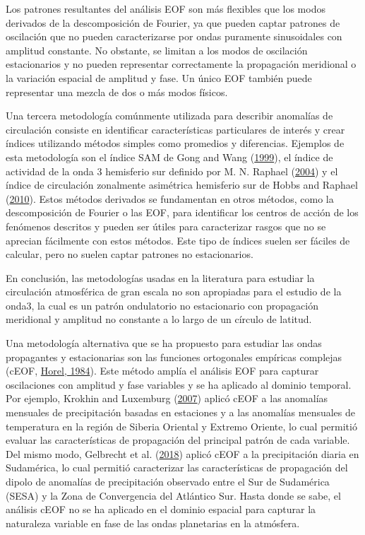 \documentclass[12pt,oneside,a4paper]{reedthesis}
\begin{document}
Los patrones resultantes del análisis EOF son más flexibles que los modos derivados de la descomposición de Fourier, ya que pueden captar patrones de oscilación que no pueden caracterizarse por ondas puramente sinusoidales con amplitud constante.
No obstante, se limitan a los modos de oscilación estacionarios y no pueden representar correctamente la propagación meridional o la variación espacial de amplitud y fase.
Un único EOF también puede representar una mezcla de dos o más modos físicos.

Una tercera metodología comúnmente utilizada para describir anomalías de circulación consiste en identificar características particulares de interés y crear índices utilizando métodos simples como promedios y diferencias.
Ejemplos de esta metodología son el índice SAM de Gong and Wang (\protect\hyperlink{ref-gong1999}{1999}), el índice de actividad de la onda 3 hemisferio sur definido por M. N. Raphael (\protect\hyperlink{ref-raphael2004}{2004}) y el índice de circulación zonalmente asimétrica hemisferio sur de Hobbs and Raphael (\protect\hyperlink{ref-hobbs2010}{2010}).
Estos métodos derivados se fundamentan en otros métodos, como la descomposición de Fourier o las EOF, para identificar los centros de acción de los fenómenos descritos y pueden ser útiles para caracterizar rasgos que no se aprecian fácilmente con estos métodos.
Este tipo de índices suelen ser fáciles de calcular, pero no suelen captar patrones no estacionarios.

En conclusión, las metodologías usadas en la literatura para estudiar la circulación atmosférica de gran escala no son apropiadas para el estudio de la onda3, la cual es un patrón ondulatorio no estacionario con propagación meridional y amplitud no constante a lo largo de un círculo de latitud.

Una metodología alternativa que se ha propuesto para estudiar las ondas propagantes y estacionarias son las funciones ortogonales empíricas complejas (cEOF, \protect\hyperlink{ref-horel1984}{Horel, 1984}).
Este método amplía el análisis EOF para capturar oscilaciones con amplitud y fase variables y se ha aplicado al dominio temporal.
Por ejemplo, Krokhin and Luxemburg (\protect\hyperlink{ref-krokhin2007}{2007}) aplicó cEOF a las anomalías mensuales de precipitación basadas en estaciones y a las anomalías mensuales de temperatura en la región de Siberia Oriental y Extremo Oriente, lo cual permitió evaluar las características de propagación del principal patrón de cada variable.
Del mismo modo, Gelbrecht et al. (\protect\hyperlink{ref-gelbrecht2018}{2018}) aplicó cEOF a la precipitación diaria en Sudamérica, lo cual permitió caracterizar las características de propagación del dipolo de anomalías de precipitación observado entre el Sur de Sudamérica (SESA) y la Zona de Convergencia del Atlántico Sur.
Hasta donde se sabe, el análisis cEOF no se ha aplicado en el dominio espacial para capturar la naturaleza variable en fase de las ondas planetarias en la atmósfera.
\end{document}
